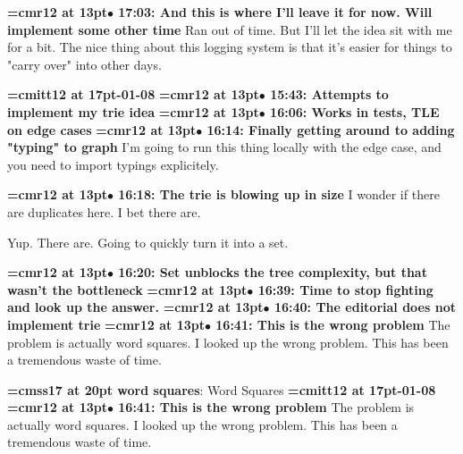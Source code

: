 {\smallskip\noindent\bf\font\titlefont=cmr12 at 13pt\titlefont $\bullet$ 17:03: And this is where I'll leave it for now. Will implement some other time}\smallskip
Ran out of time. But I'll let the idea sit with me for a bit. The nice thing about this logging system is that it's easier for things to "carry over" into other days.
\par

{\medskip\noindent\bf\font\titlefont=cmitt12 at 17pt-01-08}\medskip
{\smallskip\noindent\bf\font\titlefont=cmr12 at 13pt\titlefont $\bullet$ 15:43: Attempts to implement my trie idea}\smallskip
{\smallskip\noindent\bf\font\titlefont=cmr12 at 13pt\titlefont $\bullet$ 16:06: Works in tests, TLE on edge cases}\smallskip
{\smallskip\noindent\bf\font\titlefont=cmr12 at 13pt\titlefont $\bullet$ 16:14: Finally getting around to adding "typing" to graph}\smallskip
I'm going to run this thing locally with the edge case, and you need to import typings explicitely.
\par

{\smallskip\noindent\bf\font\titlefont=cmr12 at 13pt\titlefont $\bullet$ 16:18: The trie is blowing up in size}\smallskip
I wonder if there are duplicates here. I bet there are.
\par

Yup. There are. Going to quickly turn it into a set.
\par

{\smallskip\noindent\bf\font\titlefont=cmr12 at 13pt\titlefont $\bullet$ 16:20: Set unblocks the tree complexity, but that wasn't the bottleneck}\smallskip
{\smallskip\noindent\bf\font\titlefont=cmr12 at 13pt\titlefont $\bullet$ 16:39: Time to stop fighting and look up the answer.}\smallskip
{\smallskip\noindent\bf\font\titlefont=cmr12 at 13pt\titlefont $\bullet$ 16:40: The editorial does not implement trie}\smallskip
{\smallskip\noindent\bf\font\titlefont=cmr12 at 13pt\titlefont $\bullet$ 16:41: This is the wrong problem}\smallskip
The problem is actually word squares. I looked up the wrong problem. This has been a tremendous waste of time.
\par

{\medskip\noindent\bf\font\titlefont=cmss17 at 20pt word squares}: Word Squares
{\medskip\noindent\bf\font\titlefont=cmitt12 at 17pt-01-08}\medskip
{\smallskip\noindent\bf\font\titlefont=cmr12 at 13pt\titlefont $\bullet$ 16:41: This is the wrong problem}\smallskip
The problem is actually word squares. I looked up the wrong problem. This has been a tremendous waste of time.
\par

